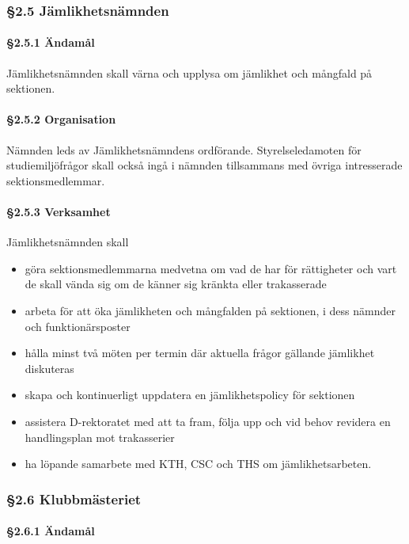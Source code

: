 \subsubsection{§2.5 Jämlikhetsnämnden}

\paragraph{§2.5.1 Ändamål}

Jämlikhetsnämnden skall värna och upplysa om jämlikhet och mångfald på sektionen.

\paragraph{§2.5.2 Organisation}

Nämnden leds av Jämlikhetsnämndens ordförande. Styrelseledamoten för studiemiljöfrågor skall också ingå i nämnden tillsammans med övriga intresserade sektionsmedlemmar.

\paragraph{§2.5.3 Verksamhet}

Jämlikhetsnämnden skall

\begin{itemize}
  \item göra sektionsmedlemmarna medvetna om vad de har för rättigheter och vart de skall vända sig om de känner sig kränkta eller trakasserade
  \item arbeta för att öka jämlikheten och mångfalden på sektionen, i dess nämnder och funktionärsposter
  \item hålla minst två möten per termin där aktuella frågor gällande jämlikhet diskuteras
  \item skapa och kontinuerligt uppdatera en jämlikhetspolicy för sektionen
  \item assistera D-rektoratet med att ta fram, följa upp och vid behov revidera en handlingsplan mot trakasserier
  \item ha löpande samarbete med KTH, CSC och THS om jämlikhetsarbeten.
\end{itemize}

\subsubsection{§2.6 Klubbmästeriet}

\paragraph{§2.6.1 Ändamål}

